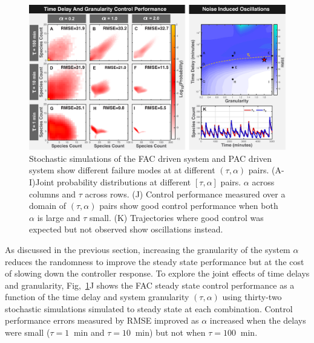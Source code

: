\documentclass[12pt]{iopart}
\begin{document}

\begin{figure}
\begin{center}
\includegraphics[width=1\textwidth]{DelayAndGranularity.pdf}
\vspace{-0.1in}
\caption{Stochastic simulations of the FAC driven system and PAC driven system show different failure modes at at different $(\tau,\alpha)$ pairs. (A-I)Joint probability distributions at different $[\tau,\alpha]$ pairs. $\alpha$ across columns and $\tau$ across rows. (J) Control performance measured over a domain of $(\tau,\alpha)$ pairs show good control performance when both $\alpha$ is large and $\tau$ small. (K) Trajectories where good control was expected but not observed show oscillations instead.}
\label{DG}
\end{center}
\vspace{-0.2in}
\end{figure}

As discussed in the previous section, increasing the granularity of the system $\alpha$ reduces the randomness to improve the steady state performance but at the cost of slowing down the controller response.  To explore the joint effects of time delays and granularity, Fig,\ \ref{DG}J shows the FAC steady state control performance as a function of the time delay and system granularity $(\tau,\alpha)$ using thirty-two stochastic simulations simulated to steady state at each combination. Control performance errors measured by RMSE improved as $\alpha$ increased when the delays were small ($\tau=1 \ $ min and $\tau=10 \ $ min) but not when $\tau=100 \ $ min. 
\end{document}
